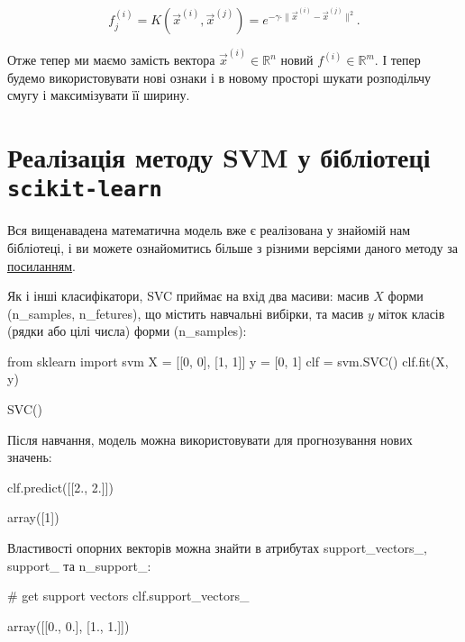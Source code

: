 \documentclass[]{article}
\begin{document}
\begin{equation*}
	f_j^{(i)} = K(\vec{x}^{(i)}, \vec{x}^{(j)}) = e^{-\gamma \cdot \|\vec{x}^{(i)} - \vec{x}^{(j)}\|^2}.
\end{equation*}

Отже тепер ми маємо замість вектора $\vec{x}^{(i)} \in \mathbb{R}^n$ новий $f^{(i)} \in \mathbb{R}^m$. І тепер будемо використовувати нові ознаки і в новому просторі шукати розподільчу смугу і максимізувати її ширину.

\section{Реалізація методу SVM у бібліотеці \texttt{scikit-learn}}

Вся вищенавадена математична модель вже є реалізована у знайомій нам бібліотеці, і ви можете ознайомитись більше з різними версіями даного методу за \href{https://scikit-learn.org/stable/modules/svm.html}{посиланням}.

Як і інші класифікатори, SVC приймає на вхід два масиви: масив $X$ форми (n\_samples, n\_fetures), що містить навчальні вибірки, та масив $y$ міток класів (рядки або цілі числа) форми (n\_samples):

\begin{notebook}
from sklearn import svm
X = [[0, 0], [1, 1]]
y = [0, 1]
clf = svm.SVC()
clf.fit(X, y)
\end{notebook}

\begin{out}
SVC()
\end{out}

Після навчання, модель можна використовувати для прогнозування нових значень:

\begin{notebook}
clf.predict([[2., 2.]])
\end{notebook}

\begin{out}
array([1])
\end{out}

Властивості опорних векторів можна знайти в атрибутах support\_vectors\_, support\_ та n\_support\_:

\begin{notebook}
# get support vectors
clf.support_vectors_
\end{notebook}

\begin{out}
array([[0., 0.],
       [1., 1.]])
\end{out}
\end{document}
